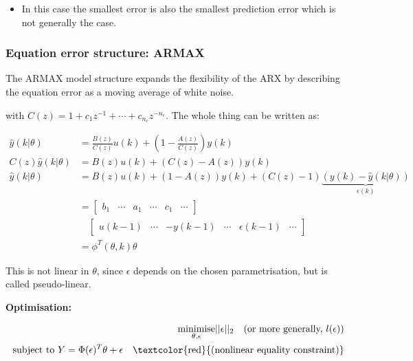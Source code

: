 \documentclass[10pt,a4paper]{scrartcl}
\begin{document}
\begin{multicols*}{2}

\begin{itemize}
\item In this case the smallest error is also the smallest prediction error which is not generally the case.
\end{itemize}

\subsubsection{Equation error structure: ARMAX}


The ARMAX model structure expands the flexibility of the ARX by describing the equation error as a moving average of white noise.


with $C(z) = 1+c_1z^{-1}+\cdots+c_{n_c}z^{-n_c}$. The whole thing can be written as:


\begin{align*}
\hat{y}(k|\theta)&=\frac{B(z)}{C(z)}u(k)+\left(1-\frac{A(z)}{C(z)}\right)y(k)\\
C(z)\hat{y}(k|\theta)&=B(z)u(k)+(C(z)-A(z))y(k)\\
\hat{y}(k|\theta)&=B(z)u(k)+(1-A(z))y(k)+(C(z)-1)\underbrace{(y(k)-\hat{y}(k|\theta))}_{\epsilon(k)}\\
&=\begin{bmatrix}
b_1&\cdots&a_1&\cdots&c_1&\cdots
\end{bmatrix}\\
&\quad\begin{bmatrix}
u(k-1)&\cdots&-y(k-1)&\cdots&\epsilon(k-1)&\cdots
\end{bmatrix}\\
&=\phi^T(\theta,k)\theta
\end{align*}

This is not linear in $\theta$, since $\epsilon$ depends on the chosen parametrisation, but is called pseudo-linear.

\textbf{Optimisation:}

\begin{align*}
\underset{\theta,\epsilon}{\text{minimise}}||\epsilon||_2\quad \text{(or more generally, $l(\epsilon)$)}\\
\text{subject to }Y=\Phi(\epsilon)^T\theta+\epsilon\quad\text{\textcolor{red}{(nonlinear equality constraint)}}
\end{align*}


\end{multicols*}
\end{document}
